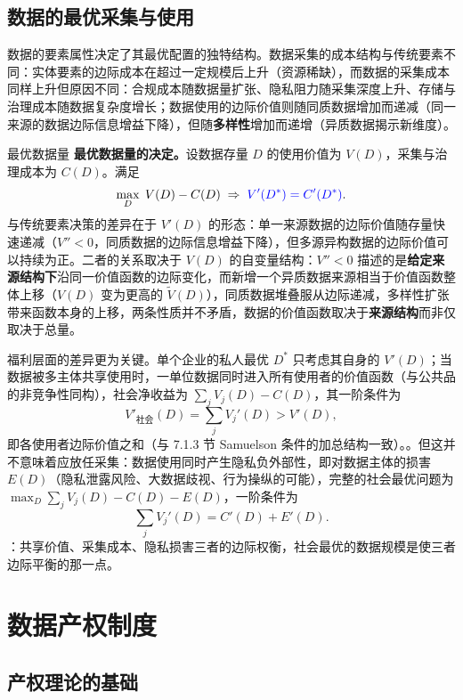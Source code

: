 \subsection{数据的最优采集与使用}

数据的要素属性决定了其最优配置的独特结构。数据采集的成本结构与传统要素不同：实体要素的边际成本在超过一定规模后上升（资源稀缺），而数据的采集成本同样上升但原因不同：合规成本随数据量扩张、隐私阻力随采集深度上升、存储与治理成本随数据复杂度增长；数据使用的边际价值则随同质数据增加而递减（同一来源的数据边际信息增益下降），但随\textbf{多样性}增加而递增（异质数据揭示新维度）。

\begin{derivation}{最优数据量}{}
\textbf{最优数据量的决定。}设数据存量 $D$ 的使用价值为 $V(D)$，采集与治理成本为 $C(D)$。满足
\[
\max_D \; V(D) - C(D) \;\Rightarrow\; {\color{blue} V'(D^*) = C'(D^*)}.
\]
与传统要素决策的差异在于 $V'(D)$ 的形态：单一来源数据的边际价值随存量快速递减（$V'' < 0$，同质数据的边际信息增益下降），但多源异构数据的边际价值可以持续为正。二者的关系取决于 $V(D)$ 的自变量结构：$V'' < 0$ 描述的是\textbf{给定来源结构下}沿同一价值函数的边际变化，而新增一个异质数据来源相当于价值函数整体上移（$V(D)$ 变为更高的 $\tilde V(D)$），同质数据堆叠服从边际递减，多样性扩张带来函数本身的上移，两条性质并不矛盾，数据的价值函数取决于\textbf{来源结构}而非仅取决于总量。

福利层面的差异更为关键。单个企业的私人最优 $D^*$ 只考虑其自身的 $V'(D)$；当数据被多主体共享使用时，一单位数据同时进入所有使用者的价值函数（与公共品的非竞争性同构），社会净收益为 $\sum_j V_j(D) - C(D)$，其一阶条件为
\[
V'_{\text{社会}}(D) = \sum_j V_j'(D) > V'(D),
\]
即各使用者边际价值之和（与 7.1.3 节 Samuelson 条件的加总结构一致）。。但这并不意味着应放任采集：数据使用同时产生隐私负外部性，即对数据主体的损害 $E(D)$（隐私泄露风险、大数据歧视、行为操纵的可能），完整的社会最优问题为 $\max_D \sum_j V_j(D) - C(D) - E(D)$，一阶条件为
\[
\sum_j V_j'(D) = C'(D) + E'(D).
\]
：共享价值、采集成本、隐私损害三者的边际权衡，社会最优的数据规模是使三者边际平衡的那一点。
\end{derivation}

\section{数据产权制度}

\subsection{产权理论的基础}

